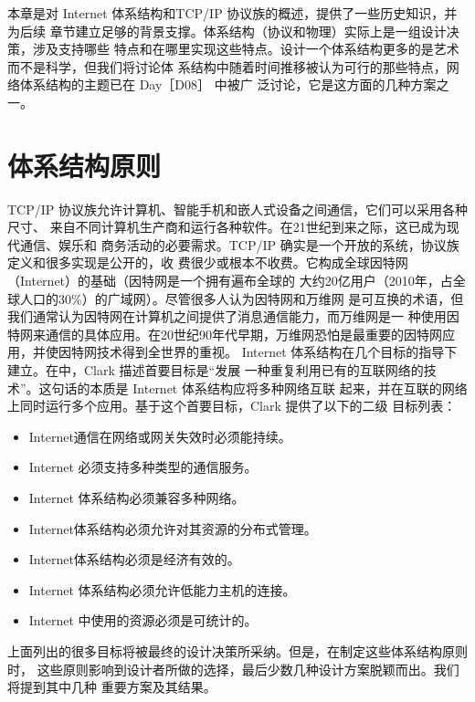 本章是对 Internet 体系结构和TCP/IP 协议族的概述，提供了一些历史知识，并为后续
章节建立足够的背景支撑。体系结构（协议和物理）实际上是一组设计决策，涉及支持哪些
特点和在哪里实现这些特点。设计一个体系结构更多的是艺术而不是科学，但我们将讨论体
系结构中随着时间推移被认为可行的那些特点，网络体系结构的主题已在 Day［D08］ 中被广
泛讨论，它是这方面的几种方案之一。

\section{体系结构原则}
TCP/IP 协议族允许计算机、智能手机和嵌人式设备之间通信，它们可以采用各种尺寸、
来自不同计算机生产商和运行各种软件。在21世纪到来之际，这已成为现代通信、娱乐和
商务活动的必要需求。TCP/IP 确实是一个开放的系统，协议族定义和很多实现是公开的，收
费很少或根本不收费。它构成全球因特网（Internet）的基础（因特网是一个拥有遍布全球的
大约20亿用户（2010年，占全球人口的30\%）的广域网）。尽管很多人认为因特网和万维网
是可互换的术语，但我们通常认为因特网在计算机之间提供了消息通信能力，而万维网是一
种使用因特网来通信的具体应用。在20世纪90年代早期，万维网恐怕是最重要的因特网应
用，并使因特网技术得到全世界的重视。
Internet 体系结构在几个目标的指导下建立。在\cite{clark1988design}中，Clark 描述首要目标是“发展
一种重复利用已有的互联网络的技术”。这句话的本质是 Internet 体系结构应将多种网络互联
起来，并在互联的网络上同时运行多个应用。基于这个首要目标，Clark 提供了以下的二级
目标列表：
\begin{itemize}
  \item Internet通信在网络或网关失效时必须能持续。
  \item Internet 必须支持多种类型的通信服务。
  \item Internet 体系结构必须兼容多种网络。
  \item Internet体系结构必须允许对其资源的分布式管理。
  \item Internet体系结构必须是经济有效的。
  \item Internet 体系结构必须允许低能力主机的连接。
  \item Internet 中使用的资源必须是可统计的。
\end{itemize}
上面列出的很多目标将被最终的设计决策所采纳。但是，在制定这些体系结构原则时，
这些原则影响到设计者所做的选择，最后少数几种设计方案脱颖而出。我们将提到其中几种
重要方案及其结果。
